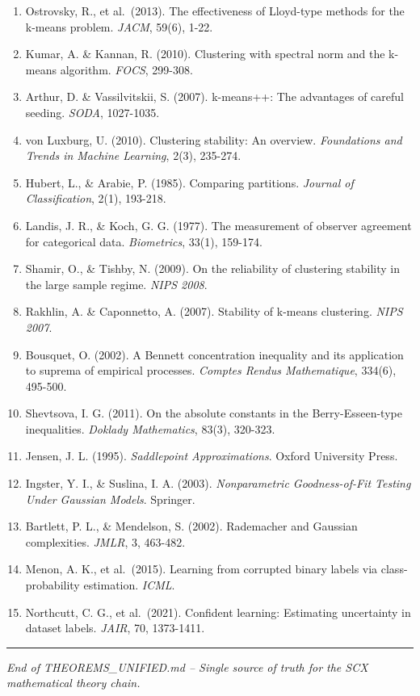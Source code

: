 \documentclass[
  12pt,
]{ctexart}
\begin{document}
\begin{enumerate}
  clustering. \emph{Machine Learning}, 75(2), 245-248.
\item
  Ostrovsky, R., et al.~(2013). The effectiveness of Lloyd-type methods
  for the k-means problem. \emph{JACM}, 59(6), 1-22.
\item
  Kumar, A. \& Kannan, R. (2010). Clustering with spectral norm and the
  k-means algorithm. \emph{FOCS}, 299-308.
\item
  Arthur, D. \& Vassilvitskii, S. (2007). k-means++: The advantages of
  careful seeding. \emph{SODA}, 1027-1035.
\item
  von Luxburg, U. (2010). Clustering stability: An overview.
  \emph{Foundations and Trends in Machine Learning}, 2(3), 235-274.
\item
  Hubert, L., \& Arabie, P. (1985). Comparing partitions. \emph{Journal
  of Classification}, 2(1), 193-218.
\item
  Landis, J. R., \& Koch, G. G. (1977). The measurement of observer
  agreement for categorical data. \emph{Biometrics}, 33(1), 159-174.
\item
  Shamir, O., \& Tishby, N. (2009). On the reliability of clustering
  stability in the large sample regime. \emph{NIPS 2008}.
\item
  Rakhlin, A. \& Caponnetto, A. (2007). Stability of k-means clustering.
  \emph{NIPS 2007}.
\item
  Bousquet, O. (2002). A Bennett concentration inequality and its
  application to suprema of empirical processes. \emph{Comptes Rendus
  Mathematique}, 334(6), 495-500.
\item
  Shevtsova, I. G. (2011). On the absolute constants in the
  Berry-Esseen-type inequalities. \emph{Doklady Mathematics}, 83(3),
  320-323.
\item
  Jensen, J. L. (1995). \emph{Saddlepoint Approximations}. Oxford
  University Press.
\item
  Ingster, Y. I., \& Suslina, I. A. (2003). \emph{Nonparametric
  Goodness-of-Fit Testing Under Gaussian Models}. Springer.
\item
  Bartlett, P. L., \& Mendelson, S. (2002). Rademacher and Gaussian
  complexities. \emph{JMLR}, 3, 463-482.
\item
  Menon, A. K., et al.~(2015). Learning from corrupted binary labels via
  class-probability estimation. \emph{ICML}.
\item
  Northcutt, C. G., et al.~(2021). Confident learning: Estimating
  uncertainty in dataset labels. \emph{JAIR}, 70, 1373-1411.
\end{enumerate}

\begin{center}\rule{0.5\linewidth}{0.5pt}\end{center}

\emph{End of THEOREMS\_UNIFIED.md -- Single source of truth for the SCX
mathematical theory chain.}
\end{document}
